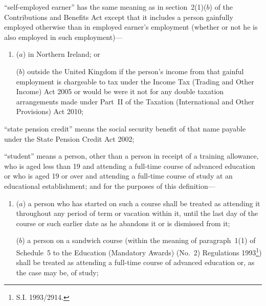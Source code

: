 \documentclass[12pt,a4paper]{article}
\begin{document}
\begin{enumerate}

“self-employed earner” has the same meaning as in section~2(1)($b$)  of the Contributions and Benefits Act except that it includes a person gainfully employed otherwise than in employed earner’s employment (whether or not he is also employed in such employment)---
\begin{enumerate}\item[]
($a$) 
in Northern Ireland; or

($b$) 
outside the United Kingdom if the person’s income from that gainful employment is chargeable to tax under the Income Tax (Trading and Other Income) Act 2005 or would be were it not for any double taxation arrangements made under Part~II of the Taxation (International and Other Provisions) Act 2010;
\end{enumerate}

“state pension credit” means the social security benefit of that name payable under the State Pension Credit Act 2002;

“student” means a person, other than a person in receipt of a training allowance, who is aged less than 19 and attending a full-time course of advanced education or who is aged 19 or over and attending a full-time course of study at an educational establishment; and for the purposes of this definition—
\begin{enumerate}\item[]
($a$) 
a person who has started on such a course shall be treated as attending it throughout any period of term or vacation within it, until the last day of the course or such earlier date as he abandons it or is dismissed from it;

($b$) 
a person on a sandwich course (within the meaning of paragraph~1(1) of Schedule~5 to the Education (Mandatory Awards) (No.\ 2) Regulations 1993\footnote{\frenchspacing S.I. 1993/2914.}) shall be treated as attending a full-time course of advanced education or, as the case may be, of study;
\end{enumerate}



\end{enumerate}
\end{document}
